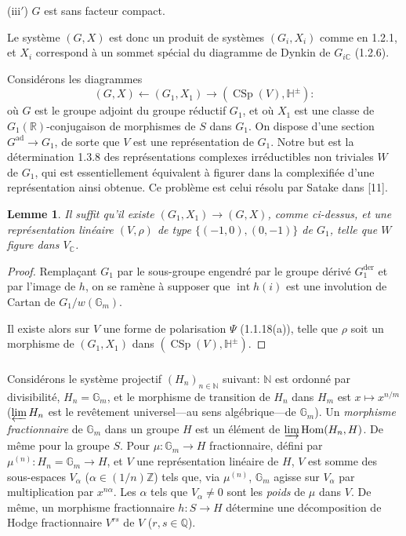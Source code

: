 \documentclass[12pt,a4paper]{article}
\theoremstyle{plain}
\newtheorem{lemma}[theorem]{Lemme}
\theoremstyle{definition}
\theoremstyle{remark}
\DeclareMathOperator{\Hom}{Hom}
\DeclareMathOperator{\CSp}{CSp}
\DeclareMathOperator{\Int}{int}
\newcommand{\ZZ}{\mathbb{Z}}
\newcommand{\QQ}{\mathbb{Q}}
\newcommand{\RR}{\mathbb{R}}
\newcommand{\CC}{\mathbb{C}}
\newcommand{\HH}{\mathbb{H}}
\newcommand{\NN}{\mathbb{N}}
\newcommand{\Gm}{\mathbb{G}}
\begin{document}
(iii$'$) $G$ est sans facteur compact.

Le syst\`eme $(G,X)$ est donc un produit de syst\`emes $(G_i,X_i)$ comme en 1.2.1, et $X_i$ correspond \`a un sommet sp\'ecial du diagramme de Dynkin de $G_{i\CC}$ (1.2.6).

Consid\'erons les diagrammes
\[
(G,X) \longleftarrow (G_1,X_1) \longrightarrow (\CSp(V),\HH^{\pm}):
\]
o\`u $G$ est le groupe adjoint du groupe r\'eductif $G_1$, et o\`u $X_1$ est une classe de $G_1(\RR)$-conjugaison de morphismes de $S$ dans $G_1$. On dispose d'une section $G^{\text{ad}} \to G_1$, de sorte que $V$ est une repr\'esentation de $G_1$. Notre but est la d\'etermination 1.3.8 des repr\'esentations complexes irr\'eductibles non triviales $W$ de $G_1$, qui est essentiellement \'equivalent \`a figurer dans la complexifi\'ee d'une repr\'esentation ainsi obtenue. Ce probl\`eme est celui r\'esolu par Satake dans [11].

\begin{lemma}
Il suffit qu'il existe $(G_1,X_1) \to (G,X)$, comme ci-dessus, et une repr\'esentation lin\'eaire $(V,\rho)$ de type $\{(-1,0),(0,-1)\}$ de $G_1$, telle que $W$ figure dans $V_{\CC}$.
\end{lemma}

\begin{proof}
Rempla\c{c}ant $G_1$ par le sous-groupe engendr\'e par le groupe d\'eriv\'e $G_1^{\text{der}}$ et par l'image de $h$, on se ram\`ene \`a supposer que $\Int h(i)$ est une involution de Cartan de $G_1/w(\Gm_m)$.

Il existe alors sur $V$ une forme de polarisation $\Psi$ (1.1.18(a)), telle que $\rho$ soit un morphisme de $(G_1,X_1)$ dans $(\CSp(V),\HH^{\pm})$.
\end{proof}

\subsubsection{}

Consid\'erons le syst\`eme projectif $(H_n)_{n \in \NN}$ suivant: $\NN$ est ordonn\'e par divisibilit\'e, $H_n = \Gm_m$, et le morphisme de transition de $H_n$ dans $H_m$ est $x \mapsto x^{n/m}$ ($\varprojlim H_n$ est le rev\^etement universel---au sens alg\'ebrique---de $\Gm_m$). Un \textit{morphisme fractionnaire} de $\Gm_m$ dans un groupe $H$ est un \'el\'ement de $\varinjlim \Hom(H_n,H)$. De m\^eme pour la groupe $S$. Pour $\mu:\Gm_m \to H$ fractionnaire, d\'efini par $\mu^{(n)}:H_n = \Gm_m \to H$, et $V$ une repr\'esentation lin\'eaire de $H$, $V$ est somme des sous-espaces $V_\alpha$ ($\alpha \in (1/n)\ZZ$) tels que, via $\mu^{(n)}$, $\Gm_m$ agisse sur $V_\alpha$ par multiplication par $x^{n\alpha}$. Les $\alpha$ tels que $V_\alpha \neq 0$ sont les \textit{poids} de $\mu$ dans $V$. De m\^eme, un morphisme fractionnaire $h:S \to H$ d\'etermine une d\'ecomposition de Hodge fractionnaire $V^{rs}$ de $V$ ($r,s \in \QQ$).
\end{document}
